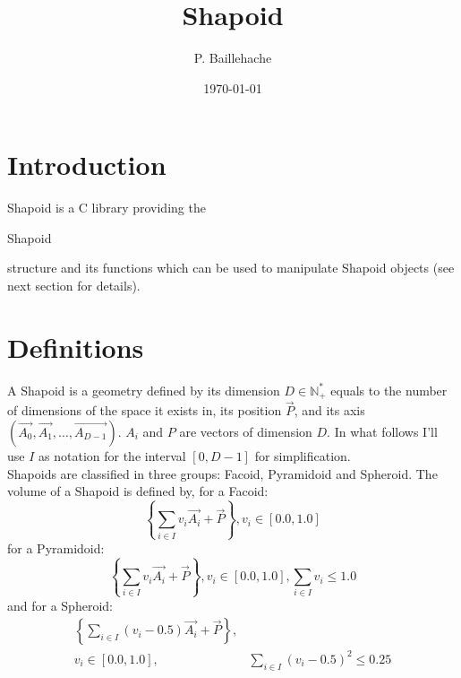 \documentclass[12pt, a4paper]{article}
\begin{document}
\title{Shapoid}
\author{P. Baillehache}
\date{\today}
\maketitle

\tableofcontents

\section*{Introduction}

Shapoid is a C library providing the \begin{ttfamily}Shapoid\end{ttfamily} structure and its functions which can be used to manipulate Shapoid objects (see next section for details).\\

\section{Definitions}

A Shapoid is a geometry defined by its dimension $D\in\mathbb{N^*_+}$ equals to the number of dimensions of the space it exists in, its position $\overrightarrow{P}$, and its axis $(\overrightarrow{A_0},\overrightarrow{A_1},...,\overrightarrow{A_{D-1}})$. $A_i$ and $P$ are vectors of dimension $D$. In what follows I'll use $I$ as notation for the interval $[0,D-1]$ for simplification.\\

Shapoids are classified in three groups: Facoid, Pyramidoid and Spheroid. The volume of a Shapoid is defined by, for a Facoid: 
\begin{equation}
\left\lbrace \sum_{i\in I}v_i\overrightarrow{A_i}+\overrightarrow{P}\right\rbrace ,v_i\in[0.0,1.0]
\end{equation}
for a Pyramidoid:
\begin{equation}
\left\lbrace \sum_{i\in I}v_i\overrightarrow{A_i}+\overrightarrow{P}\right\rbrace ,v_i\in[0.0,1.0], \sum_{i\in I}v_i\le1.0
\end{equation}
and for a Spheroid:
\begin{equation}
\begin{array}{rl}
\left\lbrace \sum_{i\in I}(v_i-0.5)\overrightarrow{A_i}+\overrightarrow{P}\right\rbrace ,&\\
v_i\in[0.0,1.0],&\sum_{i\in I}(v_i-0.5)^2\le0.25
\end{array}
\end{equation}
\end{document}
